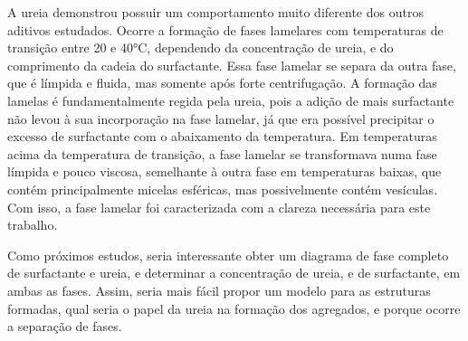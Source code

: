 	A ureia demonstrou possuir um comportamento muito diferente dos outros aditivos estudados. Ocorre a formação de fases lamelares com temperaturas de transição entre 20 e 40°C, dependendo da concentração de ureia, e do comprimento da cadeia do surfactante. Essa fase lamelar se separa da outra fase, que é límpida e fluida, mas somente após forte centrifugação. A formação das lamelas é fundamentalmente regida pela ureia, pois a adição de mais surfactante não levou à sua incorporação na fase lamelar, já que era possível precipitar o excesso de surfactante com o abaixamento da temperatura. Em temperaturas acima da temperatura de transição, a fase lamelar se transformava numa fase límpida e pouco viscosa, semelhante à outra fase em temperaturas baixas, que contém principalmente micelas esféricas, mas possivelmente contém vesículas. Com isso, a fase lamelar foi caracterizada com a clareza necessária para este trabalho.
	
	Como próximos estudos, seria interessante obter um diagrama de fase completo de surfactante e ureia, e determinar a concentração de ureia, e de surfactante, em ambas as fases. Assim, seria mais fácil propor um modelo para as estruturas formadas, qual seria o papel da ureia na formação dos agregados, e porque ocorre a separação de fases.